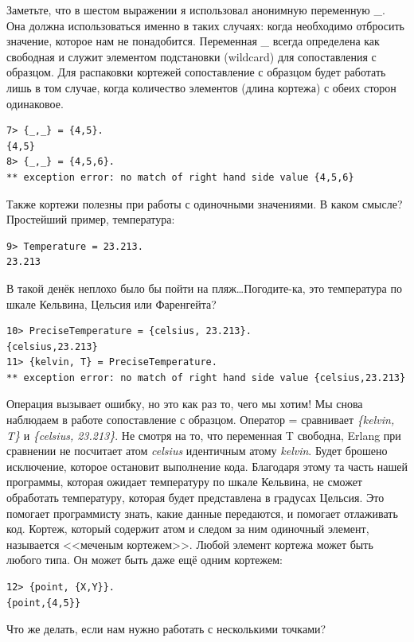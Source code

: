 \documentclass[a4paper,12pt]{report}
\newcommand{\ops}{\colorbox{lgreen}}
\begin{document}
Заметьте, что в шестом выражении я использовал анонимную переменную \_. Она должна использоваться именно в таких случаях: когда необходимо отбросить значение, которое нам не понадобится. Переменная \_ всегда определена как свободная и служит элементом подстановки (wildcard) для сопоставления с образцом. Для распаковки кортежей сопоставление с образцом будет работать лишь в том случае, когда количество элементов (длина кортежа) с обеих сторон одинаковое.
\begin{lstlisting}[style=repl]
7> {_,_} = {4,5}.
{4,5}
8> {_,_} = {4,5,6}.
** exception error: no match of right hand side value {4,5,6}
\end{lstlisting}

Также кортежи полезны при работы с одиночными значениями. В каком смысле? Простейший пример, температура:
\begin{lstlisting}[style=repl]
9> Temperature = 23.213.
23.213
\end{lstlisting}

В такой денёк неплохо было бы пойти на пляж\ldots Погодите\--ка, это температура по шкале Кельвина, Цельсия или Фаренгейта?
\begin{lstlisting}[style=repl]
10> PreciseTemperature = {celsius, 23.213}.
{celsius,23.213}
11> {kelvin, T} = PreciseTemperature.
** exception error: no match of right hand side value {celsius,23.213}
\end{lstlisting}

Операция вызывает ошибку, но это как раз то, чего мы хотим! Мы снова наблюдаем в работе сопоставление с образцом. Оператор \ops{=} сравнивает \emph{\{kelvin, T\}} и \emph{\{celsius, 23.213\}}. Не смотря на то, что переменная T свободна, Erlang при сравнении не посчитает атом \emph{celsius} идентичным атому \emph{kelvin}. Будет брошено исключение, которое остановит выполнение кода. Благодаря этому та часть нашей программы, которая ожидает температуру по шкале Кельвина, не сможет обработать температуру, которая будет представлена в градусах Цельсия. Это помогает программисту знать, какие данные передаются, и помогает отлаживать код. Кортеж, который содержит атом и следом за ним одиночный элемент, называется <<меченым кортежем>>. Любой элемент кортежа может быть любого типа. Он может быть даже ещё одним кортежем:
\begin{lstlisting}[style=repl]
12> {point, {X,Y}}.
{point,{4,5}}
\end{lstlisting}

Что же делать, если нам нужно работать с несколькими точками?
\end{document}
